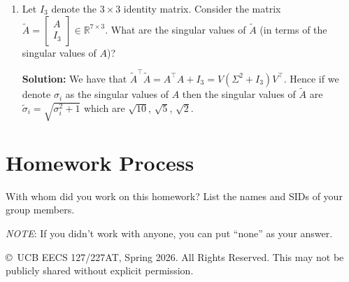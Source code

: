 \documentclass[10pt]{article}
\theoremstyle{definition}
\theoremstyle{plain}
\newcommand{\RR}{\mathbb{R}}
\begin{document}
\begin{enumerate}[label=(\alph*)]
\item Let $I_3$ denote the $3 \times 3$ identity matrix. Consider the matrix $\tilde{A} = \begin{bmatrix} A \\ I_3 \end{bmatrix} \in \RR^{7 \times 3}$. What are the singular values of $\tilde{A}$ (in terms of the singular values of $A$)?

\textbf{Solution:} We have that $\tilde{A}^\top \tilde{A} = A^\top A + I_3 = V(\Sigma^2 + I_3)V^\top$. Hence if we denote $\sigma_i$ as the singular values of $A$ then the singular values of $\tilde{A}$ are $\tilde{\sigma}_i = \sqrt{\sigma_i^2 + 1}$ which are $\sqrt{10}$, $\sqrt{5}$, $\sqrt{2}$.
\end{enumerate}

\section{Homework Process}

With whom did you work on this homework? List the names and SIDs of your group members.

\textit{NOTE}: If you didn't work with anyone, you can put ``none'' as your answer.

\vfill
\begin{center}
\small \copyright\ UCB EECS 127/227AT, Spring 2026. All Rights Reserved. This may not be publicly shared without explicit permission.
\end{center}
\end{document}
